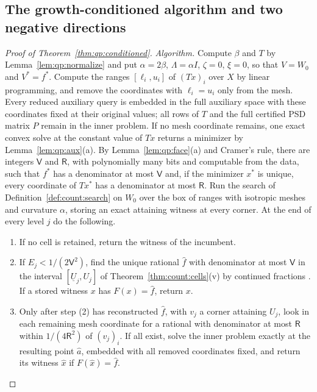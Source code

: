 \subsection{The growth-conditioned algorithm and two negative directions}

\begin{proof}[Proof of Theorem~\ref{thm:qp:conditioned}]
\emph{Algorithm.} Compute $\beta$ and $T$ by Lemma~\ref{lem:qp:normalize} and
put $\alpha=2\beta$, $\Lambda=\alpha I$, $\zeta=0$, $\xi=0$, so that
$V=W_0$ and $V^*=f^*$. Compute the ranges $[\ell_i,u_i]$ of $(Tx)_i$ over $X$
by linear programming, and remove the coordinates with $\ell_i=u_i$ only
from the mesh. Every reduced auxiliary query is embedded in the full
auxiliary space with these coordinates fixed at their original values;
all rows of $T$ and the full certified PSD matrix $P$ remain in the inner
problem. If no mesh coordinate remains, one exact convex solve at the
constant value of $Tx$ returns a
minimizer by Lemma~\ref{lem:qp:aux}(a). By Lemma~\ref{lem:qp:face}(a) and
Cramer's rule, there are integers $\mathsf V$ and $\mathsf R$, with
polynomially many bits and computable from the data, such that $f^*$ has a
denominator at most $\mathsf V$ and, if the minimizer $x^*$ is unique, every
coordinate of $Tx^*$ has a denominator at most $\mathsf R$. Run the search of
Definition~\ref{def:count:search} on $W_0$ over the box of ranges with
isotropic meshes and curvature $\alpha$, storing an exact attaining witness at
every corner. At the end of every level $j$ do the following.
\begin{enumerate}[label=(\arabic*)]
\item If no cell is retained, return the witness of the incumbent.
\item If $E_j<1/(2\mathsf V^2)$, find the unique rational $\hat f$ with
 denominator at most $\mathsf V$ in the interval $[\underline U_j,U_j]$ of
 Theorem~\ref{thm:count:cells}(v) by continued fractions
 \cite{grotschel1988-geometric-algorithms-and-combinatorial-optimization}. If a
 stored witness $x$ has $F(x)=\hat f$, return $x$.
\item Only after step (2) has reconstructed $\hat f$, with $v_j$ a corner
 attaining $U_j$, look in each remaining mesh coordinate for a
 rational with denominator at most $\mathsf R$ within $1/(4\mathsf R^2)$ of
 $(v_j)_i$. If all exist, solve the inner problem exactly at the resulting
 point $\hat a$, embedded with all removed coordinates fixed, and return
 its witness $\hat x$ if $F(\hat x)=\hat f$.
\end{enumerate}


\end{proof}
